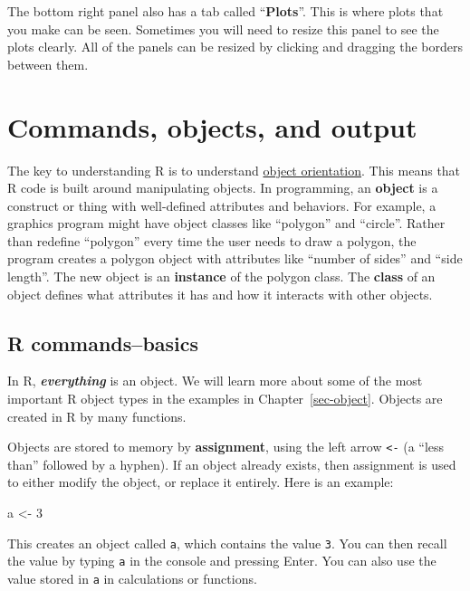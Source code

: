 \documentclass[
  13,
  letterpaper,
]{report}
\newenvironment{Shaded}{\begin{snugshade}}{\end{snugshade}}
\newcommand{\DecValTok}[1]{\textcolor[rgb]{0.68,0.00,0.00}{#1}}
\newcommand{\NormalTok}[1]{\textcolor[rgb]{0.00,0.23,0.31}{#1}}
\newcommand{\OtherTok}[1]{\textcolor[rgb]{0.00,0.23,0.31}{#1}}
\begin{document}
The bottom right panel also has a tab called ``\textbf{Plots}''. This is
where plots that you make can be seen. Sometimes you will need to resize
this panel to see the plots clearly. All of the panels can be resized by
clicking and dragging the borders between them.

\section{Commands, objects, and output}\label{sec-r-comm}

The key to understanding R is to understand
\href{https://en.wikipedia.org/wiki/Object-oriented_programming}{object
orientation}. This means that R code is built around manipulating
objects. In programming, an \textbf{object} is a construct or thing with
well-defined attributes and behaviors. For example, a graphics program
might have object classes like ``polygon'' and ``circle''. Rather than
redefine ``polygon'' every time the user needs to draw a polygon, the
program creates a polygon object with attributes like ``number of
sides'' and ``side length''. The new object is an \textbf{instance} of
the polygon class. The \textbf{class} of an object defines what
attributes it has and how it interacts with other objects.

\subsection{R commands--basics}\label{sec-r-comm-basic}

In R, \textbf{\emph{everything}} is an object. We will learn more about
some of the most important R object types in the examples in
Chapter~\ref{sec-object}. Objects are created in R by many functions.

Objects are stored to memory by \textbf{assignment}, using the left
arrow \texttt{\textless{}-} (a ``less than'' followed by a hyphen). If
an object already exists, then assignment is used to either modify the
object, or replace it entirely. Here is an example:

\begin{Shaded}
\begin{Highlighting}[]
\NormalTok{a }\OtherTok{\textless{}{-}} \DecValTok{3}
\end{Highlighting}
\end{Shaded}

This creates an object called \texttt{a}, which contains the value
\texttt{3}. You can then recall the value by typing \texttt{a} in the
console and pressing Enter. You can also use the value stored in
\texttt{a} in calculations or functions.
\end{document}
